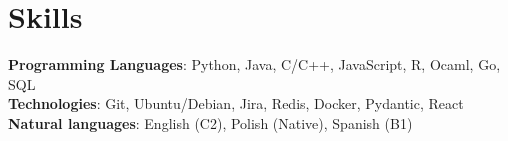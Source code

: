 \documentclass[letterpaper,11pt]{article}
\begin{document}
\section{Skills}
 \begin{itemize}[leftmargin=0.15in, label={}]
    \small{\item{
     \textbf{Programming Languages}{: Python, Java, C/C++, JavaScript, R,  Ocaml, Go, SQL} \\
     \textbf{Technologies}{: Git, Ubuntu/Debian, Jira, Redis, Docker, Pydantic, React} \\
     \textbf{Natural languages}{: English (C2), Polish (Native), Spanish (B1) } \\
    }}
 \end{itemize}
 \vspace{-16pt}
\end{document}
